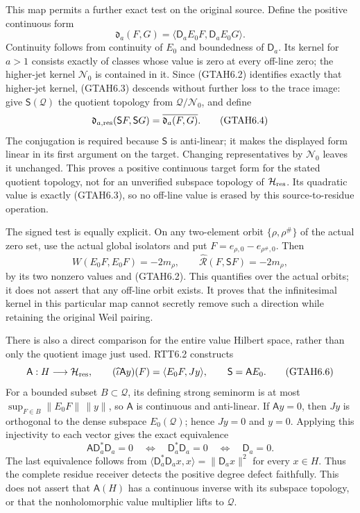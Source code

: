 This map permits a further exact test on the original source. Define the
positive continuous form \[
\mathfrak d_a(F,G)=\langle\mathsf D_aE_0F,\mathsf D_aE_0G\rangle.
\tag{GTAH6.3}
\] Continuity follows from continuity of \(E_0\) and boundedness of
\(\mathsf D_a\). Its kernel for \(a>1\) consists exactly of classes
whose value is zero at every off-line zero; the higher-jet kernel
\(\mathcal N_0\) is contained in it. Since (GTAH6.2) identifies exactly
that higher-jet kernel, (GTAH6.3) descends without further loss to the
trace image: give \(\mathsf S(\mathcal Q)\) the quotient topology from
\(\mathcal Q/\mathcal N_0\), and define \[
\mathfrak d_{a,\rm res}(\mathsf SF,\mathsf SG)
=\overline{\mathfrak d_a(F,G)}.
\tag{GTAH6.4}
\] The conjugation is required because \(\mathsf S\) is anti-linear; it
makes the displayed form linear in its first argument on the target.
Changing representatives by \(\mathcal N_0\) leaves it unchanged. This
proves a positive continuous target form for the stated quotient
topology, not for an unverified subspace topology of
\(\mathcal H_{\rm res}\). Its quadratic value is exactly (GTAH6.3), so
no off-line value is erased by this source-to-residue operation.

The signed test is equally explicit. On any two-element orbit
\(\{\rho,\rho^\#\}\) of the actual zero set, use the actual global
isolators and put \(F=e_{\rho,0}-e_{\rho^\#,0}\). Then \[
W(E_0F,E_0F)=-2m_\rho,
\qquad
\widehat{\mathcal R}(F,\mathsf SF)=-2m_\rho,
\tag{GTAH6.5}
\] by its two nonzero values and (GTAH6.2). This quantifies over the
actual orbits; it does not assert that any off-line orbit exists. It
proves that the infinitesimal kernel in this particular map cannot
secretly remove such a direction while retaining the original Weil
pairing.

There is also a direct comparison for the entire value Hilbert space,
rather than only the quotient image just used. RTT6.2 constructs \[
\mathsf A:H\longrightarrow\mathcal H_{\rm res},\qquad
(\widehat\iota\mathsf A y)(F)=\langle E_0F,Jy\rangle,
\qquad \mathsf S=\mathsf A E_0.
\tag{GTAH6.6}
\] For a bounded subset \(B\subset\mathcal Q\), its defining strong
seminorm is at most \(\sup_{F\in B}\|E_0F\|\,\|y\|\), so \(\mathsf A\)
is continuous and anti-linear. If \(\mathsf Ay=0\), then \(Jy\) is
orthogonal to the dense subspace \(E_0(\mathcal Q)\); hence \(Jy=0\) and
\(y=0\). Applying this injectivity to each vector gives the exact
equivalence \[
\mathsf A\mathsf D_a^*\mathsf D_a=0
\quad\Longleftrightarrow\quad
\mathsf D_a^*\mathsf D_a=0
\quad\Longleftrightarrow\quad
\mathsf D_a=0.
\tag{GTAH6.7}
\] The last equivalence follows from
\(\langle\mathsf D_a^*\mathsf D_ax,x\rangle=\|\mathsf D_ax\|^2\) for
every \(x\in H\). Thus the complete residue receiver detects the
positive degree defect faithfully. This does not assert that
\(\mathsf A(H)\) has a continuous inverse with its subspace topology, or
that the nonholomorphic value multiplier lifts to \(\mathcal Q\).


